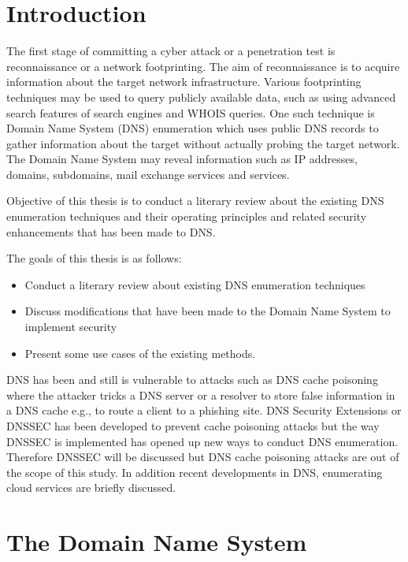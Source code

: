
\section{Introduction}

The first stage of committing a cyber attack or a penetration test is reconnaissance or a network footprinting. The aim of reconnaissance is to acquire information about the target network infrastructure. Various footprinting techniques may be used to query publicly available data, such as using advanced search features of search engines and WHOIS queries. One such technique is Domain Name System (DNS) enumeration which uses public DNS records to gather information about the target without actually probing the target network. The Domain Name System may reveal information such as IP addresses, domains, subdomains, mail exchange services and services.

Objective of this thesis is to conduct a literary review about the existing DNS enumeration techniques and their operating principles and related security enhancements that has been made to DNS.

The goals of this thesis is as follows:

\begin{itemize}
 \item Conduct a literary review about existing DNS enumeration techniques
 \item Discuss modifications that have been made to the Domain Name System to implement security
 \item Present some use cases of the existing methods.
\end{itemize}

DNS has been and still is vulnerable to attacks such as DNS cache poisoning where the attacker tricks a DNS server or a resolver to store false information in a DNS cache e.g., to route a client to a phishing site. DNS Security Extensions or DNSSEC has been developed to prevent cache poisoning attacks but the way DNSSEC is implemented has opened up new ways to conduct DNS enumeration. Therefore DNSSEC will be discussed but DNS cache poisoning attacks are out of the scope of this study. In addition recent developments in DNS, enumerating cloud services are briefly discussed.


\section{The Domain Name System}

